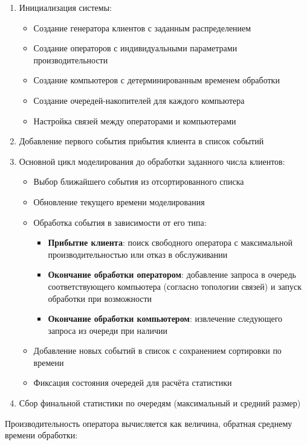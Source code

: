 \begin{enumerate}
    \item Инициализация системы:
    \begin{itemize}
        \item Создание генератора клиентов с заданным распределением
        \item Создание операторов с индивидуальными параметрами производительности
        \item Создание компьютеров с детерминированным временем обработки
        \item Создание очередей-накопителей для каждого компьютера
        \item Настройка связей между операторами и компьютерами
    \end{itemize}
    \item Добавление первого события прибытия клиента в список событий
    \item Основной цикл моделирования до обработки заданного числа клиентов:
    \begin{itemize}
        \item Выбор ближайшего события из отсортированного списка
        \item Обновление текущего времени моделирования
        \item Обработка события в зависимости от его типа:
        \begin{itemize}
            \item \textbf{Прибытие клиента}: поиск свободного оператора с максимальной производительностью или отказ в обслуживании
            \item \textbf{Окончание обработки оператором}: добавление запроса в очередь соответствующего компьютера (согласно топологии связей) и запуск обработки при возможности
            \item \textbf{Окончание обработки компьютером}: извлечение следующего запроса из очереди при наличии
        \end{itemize}
        \item Добавление новых событий в список с сохранением сортировки по времени
        \item Фиксация состояния очередей для расчёта статистики
    \end{itemize}
    \item Сбор финальной статистики по очередям (максимальный и средний размер)
\end{enumerate}

Производительность оператора вычисляется как величина, обратная среднему времени обработки:

